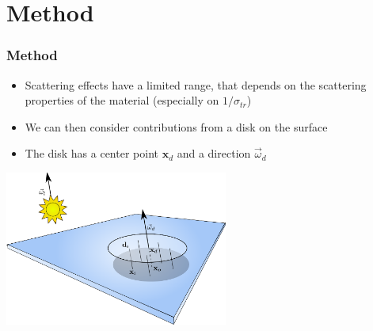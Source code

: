 \documentclass{beamer}
\newcommand{\vomega}{\vec{\omega}}
\newcommand{\x}{\mathbf{x}}
\begin{document}
\section{Method}
\begin{frame}
    \frametitle{Method}
			\begin{itemize}
			\vspace{0.2cm}
			\item Scattering effects have a limited range, that depends on the scattering properties of the material (especially on $1/\sigma_{tr}$)
			\item We can then consider contributions from a disk on the surface
			\item The disk has a center point $\x_d$ and a direction $\vomega_d$
			\end{itemize}
			\centering
			\includegraphics[width=0.55\textwidth]{disk_setup.pdf} 
\end{frame}
\end{document}
